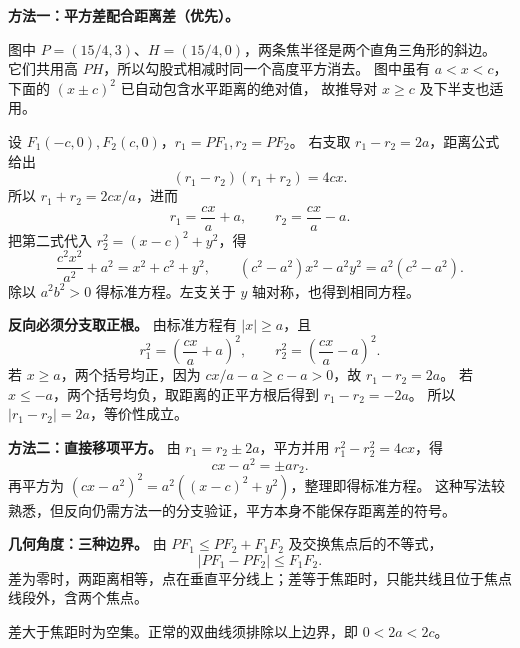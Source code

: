 \begin{proofbox}
\textbf{方法一：平方差配合距离差（优先）。}

图中 $P=(15/4,3)$、$H=(15/4,0)$，两条焦半径是两个直角三角形的斜边。
它们共用高 $PH$，所以勾股式相减时同一个高度平方消去。
图中虽有 $a<x<c$，下面的 $(x\pm c)^2$ 已自动包含水平距离的绝对值，
故推导对 $x\ge c$ 及下半支也适用。
\par\medskip\noindent
设 $F_1(-c,0),F_2(c,0)$，$r_1=PF_1,r_2=PF_2$。
右支取 $r_1-r_2=2a$，距离公式给出
\[
(r_1-r_2)(r_1+r_2)=4cx.
\]
所以 $r_1+r_2=2cx/a$，进而
\[
r_1=\frac{cx}{a}+a,\qquad r_2=\frac{cx}{a}-a.
\]
把第二式代入 $r_2^2=(x-c)^2+y^2$，得
\[
\frac{c^2x^2}{a^2}+a^2=x^2+c^2+y^2,
\qquad (c^2-a^2)x^2-a^2y^2=a^2(c^2-a^2).
\]
除以 $a^2b^2>0$ 得标准方程。左支关于 $y$ 轴对称，也得到相同方程。

\textbf{反向必须分支取正根。}
由标准方程有 $|x|\ge a$，且
\[
r_1^2=\left(\frac{cx}{a}+a\right)^2,\qquad
r_2^2=\left(\frac{cx}{a}-a\right)^2.
\]
若 $x\ge a$，两个括号均正，因为 $cx/a-a\ge c-a>0$，故 $r_1-r_2=2a$。
若 $x\le-a$，两个括号均负，取距离的正平方根后得到 $r_1-r_2=-2a$。
所以 $|r_1-r_2|=2a$，等价性成立。
\end{proofbox}
\clearpage
\begin{proofbox}
\textbf{方法二：直接移项平方。}
由 $r_1=r_2\pm2a$，平方并用 $r_1^2-r_2^2=4cx$，得
\[
cx-a^2=\pm ar_2.
\]
再平方为 $(cx-a^2)^2=a^2((x-c)^2+y^2)$，整理即得标准方程。
这种写法较熟悉，但反向仍需方法一的分支验证，平方本身不能保存距离差的符号。

\textbf{几何角度：三种边界。}
由 $PF_1\le PF_2+F_1F_2$ 及交换焦点后的不等式，
\[
|PF_1-PF_2|\le F_1F_2.
\]
差为零时，两距离相等，点在垂直平分线上；差等于焦距时，只能共线且位于焦点线段外，含两个焦点。

差大于焦距时为空集。正常的双曲线须排除以上边界，即 $0<2a<2c$。
\end{proofbox}
\clearpage

